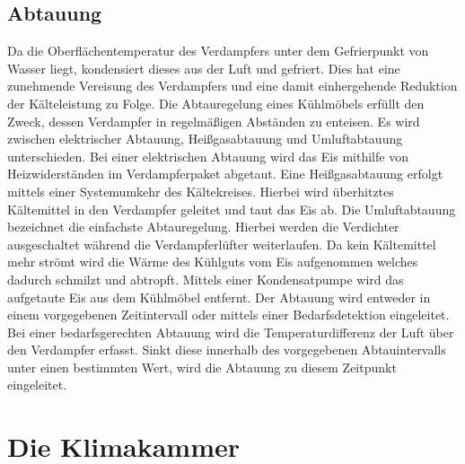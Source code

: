 \subsection{Abtauung}
\label{subsec:Abtauung}

Da die Oberflächentemperatur des Verdampfers unter dem Gefrierpunkt von Wasser liegt, kondensiert dieses aus der Luft und gefriert. Dies hat eine zunehmende Vereisung des Verdampfers und eine damit einhergehende Reduktion der Kälteleistung zu Folge.
Die Abtauregelung eines Kühlmöbels erfüllt den Zweck, dessen Verdampfer in regelmäßigen Abständen zu enteisen. Es wird zwischen elektrischer Abtauung, Heißgasabtauung und Umluftabtauung unterschieden. Bei einer elektrischen Abtauung wird das Eis mithilfe von Heizwiderständen im Verdampferpaket abgetaut. Eine Heißgasabtauung erfolgt mittels einer Systemumkehr des Kältekreises. Hierbei wird überhitztes Kältemittel in den Verdampfer geleitet und taut das Eis ab. Die Umluftabtauung bezeichnet die einfachste Abtauregelung. Hierbei werden die Verdichter ausgeschaltet während die Verdampferlüfter weiterlaufen. Da kein Kältemittel mehr strömt wird die Wärme des Kühlguts vom Eis aufgenommen welches dadurch schmilzt und abtropft. Mittels einer Kondensatpumpe wird das aufgetaute Eis aus dem Kühlmöbel entfernt. \newline
Der Abtauung wird entweder in einem vorgegebenen Zeitintervall oder mittels einer Bedarfsdetektion eingeleitet. Bei einer bedarfsgerechten Abtauung wird die Temperaturdifferenz der Luft über den Verdampfer erfasst. Sinkt diese innerhalb des vorgegebenen Abtauintervalls unter einen bestimmten Wert, wird die Abtauung zu diesem Zeitpunkt eingeleitet.



\section{Die Klimakammer}
\label{sec:Die Klimakammer}

